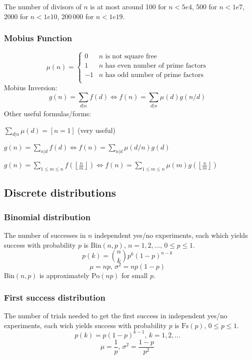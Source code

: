 \documentclass[
	a4paper,
	landscape,
	10pt,
]{article}
\begin{document}
\begin{multicols}{3}
	The number of divisors of $n$ is at most around 100 for $n < 5e4$, 500 for $n < 1e7$, 2000 for $n < 1e10$, 200\,000 for $n < 1e19$.

\subsubsection*{Mobius Function}
\[
	\mu(n) = \begin{cases} 0 & n \textrm{ is not square free}\\ 1 & n \textrm{ has even number of prime factors}\\ -1 & n \textrm{ has odd number of prime factors}\\\end{cases}
\]
  Mobius Inversion:
  \[ g(n) = \sum_{d|n} f(d) \Leftrightarrow f(n) = \sum_{d|n} \mu(d)g(n/d) \]
  Other useful formulas/forms:

  $ \sum_{d | n} \mu(d) = [ n = 1] $ (very useful)

  $ g(n) = \sum_{n|d} f(d) \Leftrightarrow f(n) = \sum_{n|d} \mu(d/n)g(d)$

 $ g(n) = \sum_{1 \leq m \leq n} f(\left\lfloor\frac{n}{m}\right \rfloor ) \Leftrightarrow f(n) = \sum_{1\leq m\leq n} \mu(m)g(\left\lfloor\frac{n}{m}\right\rfloor)$



\subsection{Discrete distributions}

\subsubsection*{Binomial distribution}
The number of successes in $n$ independent yes/no experiments, each which yields success with probability $p$ is $\textrm{Bin}(n,p),\,n=1,2,\dots,\, 0\leq p\leq1$.
\[p(k)=\binom{n}{k}p^k(1-p)^{n-k}\]
\[\mu = np,\,\sigma^2=np(1-p)\]
$\textrm{Bin}(n,p)$ is approximately $\textrm{Po}(np)$ for small $p$.

\subsubsection*{First success distribution}
The number of trials needed to get the first success in independent yes/no experiments, each wich yields success with probability $p$ is $\textrm{Fs}(p),\,0\leq p\leq1$.
\[p(k)=p(1-p)^{k-1},\,k=1,2,\dots\]
\[\mu = \frac1p,\,\sigma^2=\frac{1-p}{p^2}\]


\end{multicols}
\end{document}

